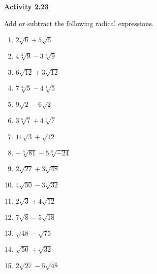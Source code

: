 \vspace{1ex}
\noindent\textbf{Activity 2.23}

\vspace{0.75ex}

Add or subtract the following radical expressions.

\begin{multicols}{2}
\begin{enumerate}[noitemsep, label = \color{blue}\arabic*. ]
    \item $2\sqrt{6} + 5\sqrt{6}$
    \item $4\sqrt[{\scriptstyle 3}]{9} - 3\sqrt[{\scriptstyle 3}]{9}$
    \item $6\sqrt{12} + 3\sqrt{12}$
    \item $7\sqrt[{\scriptstyle 4}]{5} - 4\sqrt[{\scriptstyle 4}]{5}$
    \item $9\sqrt{2} - 6\sqrt{2}$
    \item $3\sqrt[{\scriptstyle 5}]{7} + 4\sqrt[{\scriptstyle 5}]{7}$
    \item $11\sqrt{3} + \sqrt{12}$
    \item $-\sqrt[{\scriptstyle 3}]{81} - 5\sqrt[{\scriptstyle 3}]{-24}$
    \item $2\sqrt{27} + 3\sqrt{48}$
    \item $4\sqrt{50} - 3\sqrt{32}$
    \item $2\sqrt{3} + 4\sqrt{12}$
    \item $7\sqrt{8} - 5\sqrt{18}$
    \item $\sqrt{48} - \sqrt{75}$
    \item $\sqrt{50} + \sqrt{32}$
    \item $2\sqrt{27} - 5\sqrt{48}$      
\end{enumerate}
\end{multicols}

